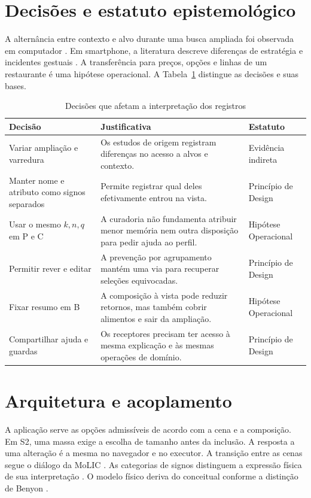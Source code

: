 \section{Decisões e estatuto epistemológico}
A alternância entre contexto e alvo durante uma busca ampliada foi observada em computador \cite[p.~9]{billah}. Em smartphone, a literatura descreve diferenças de estratégia e incidentes gestuais \cite[pp.~12, 20, 25]{islam}. A transferência para preços, opções e linhas de um restaurante é uma hipótese operacional. A Tabela~\ref{tab:dec} distingue as decisões e suas bases.
\begin{table}[ht]
\caption{Decisões que afetam a interpretação dos registros}
\label{tab:dec}
\footnotesize\centering
\begin{tabularx}{\columnwidth}{@{}>{\raggedright\arraybackslash}p{}>{\raggedright\arraybackslash}X>{\raggedright\arraybackslash}p{}@{}}
\hline Decisão & Justificativa & Estatuto\\ \hline
Variar ampliação e varredura & Os estudos de origem registram diferenças no acesso a alvos e contexto. & Evidência indireta\\
Manter nome e atributo como signos separados & Permite registrar qual deles efetivamente entrou na vista. & Princípio de Design\\
Usar o mesmo $k,n,q$ em P e C & A curadoria não fundamenta atribuir menor memória nem outra disposição para pedir ajuda ao perfil. & Hipótese Operacional\\
Permitir rever e editar & A prevenção por agrupamento mantém uma via para recuperar seleções equivocadas. & Princípio de Design\\
Fixar resumo em B & A composição à vista pode reduzir retornos, mas também cobrir alimentos e sair da ampliação. & Hipótese Operacional\\
Compartilhar ajuda e guardas & Os receptores precisam ter acesso à mesma explicação e às mesmas operações de domínio. & Princípio de Design\\ \hline
\end{tabularx}
\end{table}

\section{Arquitetura e acoplamento}
A aplicação serve as opções admissíveis de acordo com a cena e a composição. Em S2, uma massa exige a escolha de tamanho antes da inclusão. A resposta a uma alteração é a mesma no navegador e no executor. A transição entre as cenas segue o diálogo da MoLIC \cite{molic}. As categorias de signos distinguem a expressão física de sua interpretação \cite[p.~230]{barbosa}. O modelo físico deriva do conceitual conforme a distinção de Benyon \cite[p.~199]{benyon}.


